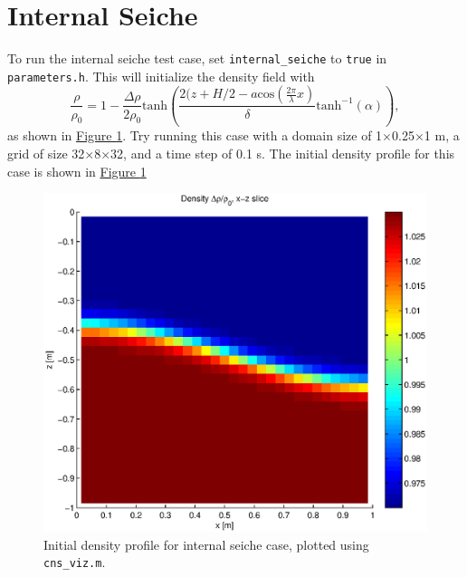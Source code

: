 \documentclass[12pt]{report}
\begin{document}
\section{Internal Seiche}
To run the internal seiche test case, set \texttt{internal\_seiche} to \texttt{true} in \texttt{parameters.h}. This will initialize the density field with
\begin{equation}
\frac{\rho}{\rho_0}=1-\frac{\Delta\rho}{2\rho_0}\text{tanh}\left(\frac{2(z+H/2-a\text{cos}(\frac{2\pi}{\lambda}x)}{\delta}\text{tanh}^{-1}(\alpha)\right),
\end{equation}
as shown in \hyperref[fig:seiche]{Figure \ref*{fig:seiche}}. Try running this case with a domain size of 1$\times$0.25$\times$1 m, a grid of size 32$\times$8$\times$32, and a time step of 0.1 s. The initial density profile for this case is shown in  \hyperref[fig:seiche]{Figure \ref*{fig:seiche}}
\begin{figure}
\centering
\includegraphics[scale=0.6]{seiche}
\caption{Initial density profile for internal seiche case, plotted using \texttt{cns\_viz.m}.}
\label{fig:seiche}
\end{figure}
\end{document}
